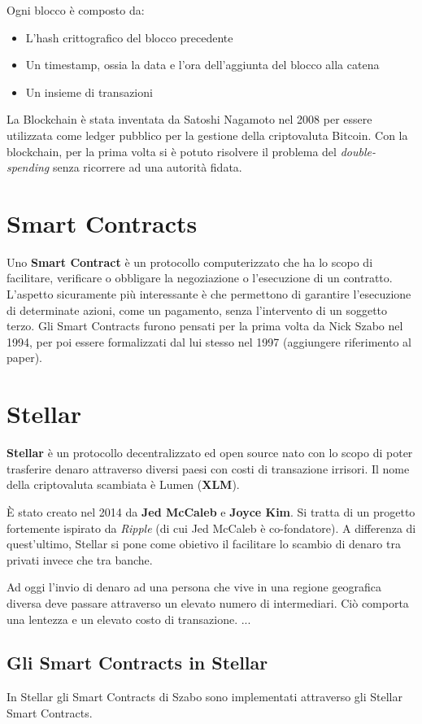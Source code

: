 Ogni blocco è composto da:
\begin{itemize}
	\item L'hash crittografico del blocco precedente
	\item Un timestamp, ossia la data e l'ora dell'aggiunta del blocco alla catena
	\item Un insieme di transazioni
\end{itemize}
La Blockchain è stata inventata da Satoshi Nagamoto nel 2008 per essere utilizzata
come ledger pubblico per la gestione della criptovaluta Bitcoin. Con la blockchain,
per la prima volta si è potuto risolvere il problema del \textit{double-spending}
senza ricorrere ad una autorità fidata.

\section{Smart Contracts}
Uno \textbf{Smart Contract} è un protocollo computerizzato che ha lo scopo di
facilitare, verificare o obbligare la negoziazione o l'esecuzione di un contratto.
L'aspetto sicuramente più interessante è che permettono di garantire l'esecuzione
di determinate azioni, come un pagamento, senza l'intervento di un soggetto terzo.
Gli Smart Contracts furono pensati per la prima volta da Nick Szabo nel 1994, per poi
essere formalizzati dal lui stesso nel 1997 (aggiungere riferimento al paper).

\section{Stellar}

\textbf{Stellar} è un protocollo decentralizzato ed
open source nato con lo scopo di poter
trasferire denaro attraverso diversi
paesi con costi di transazione irrisori. Il nome della criptovaluta scambiata
è Lumen (\textbf{XLM}).

È stato creato nel 2014 da \textbf{Jed McCaleb} e \textbf{Joyce Kim}. 
Si tratta di un progetto fortemente ispirato da \textit{Ripple} (di cui Jed McCaleb 
è co-fondatore). A differenza di quest'ultimo, Stellar si pone come obietivo
il facilitare lo scambio di denaro tra privati invece che tra banche.

Ad oggi l'invio di denaro ad una persona che vive in una regione geografica 
diversa deve passare attraverso un elevato numero di intermediari. Ciò comporta
una lentezza e un elevato costo di transazione.
...


\subsection{Gli Smart Contracts in Stellar}
In Stellar gli Smart Contracts di Szabo sono implementati
attraverso gli Stellar Smart Contracts.


